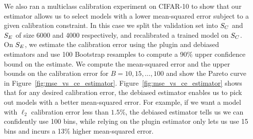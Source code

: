 We also ran a multiclass calibration experiment on CIFAR-10 to show that our estimator allows us to select models with a lower mean-squared error subject to a given calibration constraint. In this case we split the validation set into $S_C{}$ and $S_E{}$ of size 6000 and 4000 respectively, and recalibrated a trained model on $S_C{}$. On $S_E{}$, we estimate the calibration error using the plugin and debiased estimators and use 100 Bootstrap resamples to compute a 90\% upper confidence bound on the estimate. We compute the mean-squared error and the upper bounds on the calibration error for $B = 10, 15, \dots, 100$ and show the Pareto curve in Figure~\ref{fig:mse_vs_ce_estimator}. Figure~\ref{fig:mse_vs_ce_estimator} shows that for any desired calibration error, the debiased estimator enables us to pick out models with a better mean-squared error. For example, if we want a model with $\ell_2$ calibration error less than $1.5\%$, the debiased estimator tells us we can confidently use 100 bins, while relying on the plugin estimator only lets us use 15 bins and incurs a 13\% higher mean-squared error.




